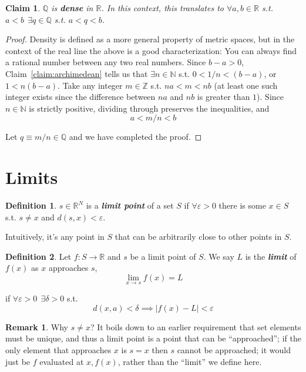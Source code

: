 \documentclass{article}
\newcommand{\R}{\mathbb{R}}
\newcommand{\Q}{\mathbb{Q}}
\newcommand{\keyword}[1]{\textit{\textbf{#1}}\index{#1}}
\newtheorem{claim}{Claim}
\theoremstyle{definition}
\newtheorem{definition}{Definition}
\newtheorem{remark}{Remark}
\begin{document}
\begin{claim}
  $\Q$ is \keyword{dense} in $\R$. In this context, this translates to $\forall a, b \in \R$ s.t. $a < b ~~ \exists q \in \Q$ s.t. $a < q < b$.
\end{claim}

\begin{proof}
  Density is defined as a more general property of metric spaces, but in the context of the real line the above is a good characterization: You can always find a rational number between any two real numbers.  Since $b - a > 0$, Claim~\ref{claim:archimedean} tells us that $\exists n \in \mathbb{N}$ s.t. $0 < 1/n < (b - a)$, or $1 < n(b - a)$. Take any integer $m \in \mathbb{Z}$ s.t. $na < m < nb$ (at least one such integer exists since the difference between $na$ and $nb$ is greater than $1$). Since $n \in \mathbb{N}$ is strictly positive, dividing  through preserves the inequalities, and
  \[
    a < m/n < b
  \]

  Let $q \equiv m/n \in \mathbb{Q}$ and we have completed the proof.
\end{proof}

\section{Limits}
\begin{definition}
  $s \in \R^N$ is a \keyword{limit point} of a set $S$ if $\forall \varepsilon > 0$ there is some $x \in S$ s.t. $s \ne x$ and $d(s, x) < \varepsilon$.
\end{definition}
Intuitively, it's any point in $S$ that can be arbitrarily close to other points in $S$.
\begin{definition}\label{def:limit}
  Let $f: S \to \R$ and $s$ be a limit point of $S$. We say $L$ is the \keyword{limit} of $f(x)$ as $x$ approaches $s$,
  \begin{equation*}
    \lim_{x \to s} f(x) = L
  \end{equation*}

  if $\forall \varepsilon > 0 ~~ \exists \delta > 0$ s.t.
  \begin{equation*}
    d(x, a) < \delta \implies |f(x) - L| < \varepsilon
  \end{equation*}
\end{definition}

\begin{remark}
  Why $s \ne x$? It boils down to an earlier requirement that set elements must be unique, and thus a limit point is a point that can be ``approached''; if the only element that approaches $x$ is $s = x$ then $s$ cannot be approached; it would just be $f$ evaluated at $x, f(x)$, rather than the ``limit'' we define here.
\end{remark}
\end{document}

